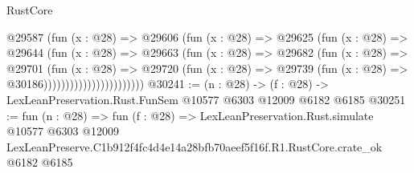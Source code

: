 \begin{lexlean}{RustCore}
\begin{coremodule}
                              @29587
                                (fun (x : @28) =>
                                @29606
                                  (fun (x : @28) =>
                                  @29625
                                    (fun (x : @28) =>
                                    @29644
                                      (fun (x : @28) =>
                                      @29663
                                        (fun (x : @28) =>
                                        @29682
                                          (fun (x : @28) =>
                                          @29701
                                            (fun (x : @28) =>
                                            @29720
                                              (fun (x : @28) =>
                                              @29739 (fun (x : @28) => @30186)))))))))))))))))))))))
@30241 := (n : @28) -> (f : @28) -> LexLeanPreservation.Rust.FunSem @10577 @6303 @12009 @6182 @6185
@30251 := fun (n : @28) =>
  fun (f : @28) =>
  LexLeanPreservation.Rust.simulate
    @10577
    @6303
    @12009
    LexLeanPreserve.C1b912f4fc4d4e14a28bfb70aeef5f16f.R1.RustCore.crate_ok
    @6182
    @6185
\end{coremodule}
\end{lexlean}
